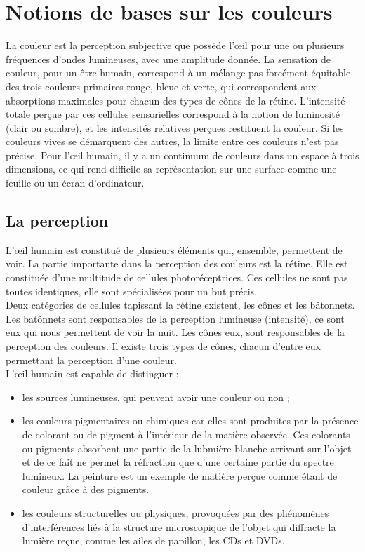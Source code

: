 \documentclass[french,a4paper]{report}
\begin{document}
{\chapter{Notions de bases sur les couleurs}
\label{chpnotionscouleurs}
La couleur est la perception subjective que possède l'œil pour une ou plusieurs fréquences d'ondes
lumineuses, avec une amplitude donnée. La sensation de couleur, pour un être humain, correspond
à un mélange pas forcément équitable des trois couleurs primaires rouge, bleue et verte, qui correspondent aux absorptions
maximales pour chacun des types de cônes de la rétine. L'intensité totale perçue par ces
cellules sensorielles correspond à la notion de luminosité (clair ou sombre), et les
intensités relatives perçues restituent la couleur. Si les couleurs vives se démarquent
des autres, la limite entre ces couleurs n'est pas précise. Pour l'œil humain, il y a un
continuum de couleurs dans un espace à trois dimensions, ce qui rend difficile sa
représentation sur une surface comme une feuille ou un écran d'ordinateur.
\section{La perception}
L'œil humain est constitué de plusieurs éléments qui, ensemble,
permettent de voir. La partie importante dans la perception des
couleurs est la rétine. Elle est constituée d'une multitude de cellules
photoréceptrices. Ces cellules ne sont pas toutes identiques, elle sont
spécialisées pour un but précis.\\
Deux catégories de cellules tapissant la rétine existent, les cônes et
les bâtonnets. Les batônnets sont responsables de la perception
lumineuse (intensité), ce sont eux qui nous permettent de voir la
nuit. Les cônes eux, sont responsables de la perception des couleurs.
Il existe trois types de cônes, chacun d'entre eux permettant la perception
d'une couleur.\\
L'œil humain est capable de distinguer :
\begin{itemize}\setlength{\itemsep}{0.4\baselineskip}
\item les sources lumineuses, qui peuvent avoir une couleur ou non ;
\item les couleurs pigmentaires ou chimiques car elles sont produites par
la présence de colorant ou de pigment à l'intérieur de la matière
observée. Ces colorants ou pigments absorbent une partie de la
lubmière blanche arrivant sur l'objet et de ce fait ne permet la
réfraction que d'une certaine partie du spectre lumineux. La
peinture est un exemple de matière perçue comme étant de couleur
grâce à des pigments.
\item les couleurs structurelles ou physiques, provoquées par des
phénomènes d'interférences liés à la structure microscopique de
l'objet qui diffracte la lumière reçue, comme les ailes de papillon,
les CDs et DVDs.
\end{itemize}
\newpage
}
\end{document}
